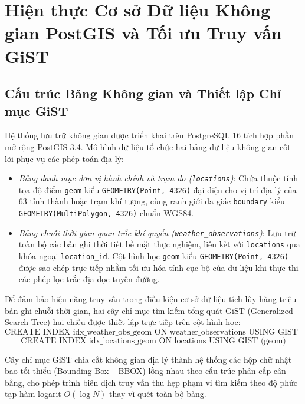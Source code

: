 \section{Hiện thực Cơ sở Dữ liệu Không gian PostGIS và Tối ưu Truy vấn GiST}
\label{sec:postgis_gist_impl}

\subsection{Cấu trúc Bảng Không gian và Thiết lập Chỉ mục GiST}
Hệ thống lưu trữ không gian được triển khai trên PostgreSQL 16 tích hợp phần mở rộng PostGIS 3.4. Mô hình dữ liệu tổ chức hai bảng dữ liệu không gian cốt lõi phục vụ các phép toán địa lý:
\begin{itemize}
    \item[-] \textit{Bảng danh mục đơn vị hành chính và trạm đo (\texttt{locations})}: Chứa thuộc tính tọa độ điểm \texttt{geom} kiểu \texttt{GEOMETRY(Point, 4326)} đại diện cho vị trí địa lý của 63 tỉnh thành hoặc trạm khí tượng, cùng ranh giới đa giác \texttt{boundary} kiểu \texttt{GEOMETRY(MultiPolygon, 4326)} chuẩn WGS84.
    \item[-] \textit{Bảng chuỗi thời gian quan trắc khí quyển (\texttt{weather\_observations})}: Lưu trữ toàn bộ các bản ghi thời tiết bề mặt thực nghiệm, liên kết với \texttt{locations} qua khóa ngoại \texttt{location\_id}. Cột hình học \texttt{geom} kiểu \texttt{GEOMETRY(Point, 4326)} được sao chép trực tiếp nhằm tối ưu hóa tính cục bộ của dữ liệu khi thực thi các phép lọc trắc địa dọc tuyến đường.
\end{itemize}

Để đảm bảo hiệu năng truy vấn trong điều kiện cơ sở dữ liệu tích lũy hàng triệu bản ghi chuỗi thời gian, hai cây chỉ mục tìm kiếm tổng quát GiST (Generalized Search Tree) hai chiều được thiết lập trực tiếp trên cột hình học:
\begin{equation}
\label{eq:gist_index_def_vi}
\text{CREATE INDEX idx\_weather\_obs\_geom ON weather\_observations USING GIST (geom)}
\end{equation}
\begin{equation}
\label{eq:gist_loc_def_vi}
\text{CREATE INDEX idx\_locations\_geom ON locations USING GIST (geom)}
\end{equation}

Cây chỉ mục GiST chia cắt không gian địa lý thành hệ thống các hộp chữ nhật bao tối thiểu (Bounding Box -- BBOX) lồng nhau theo cấu trúc phân cấp cân bằng, cho phép trình biên dịch truy vấn thu hẹp phạm vi tìm kiếm theo độ phức tạp hàm logarit $O(\log N)$ thay vì quét toàn bộ bảng.

